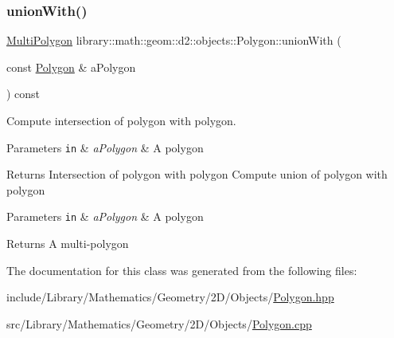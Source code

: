\subsubsection{\texorpdfstring{union\+With()}{unionWith()}}
{\footnotesize\ttfamily \hyperlink{classlibrary_1_1math_1_1geom_1_1d2_1_1objects_1_1_multi_polygon}{Multi\+Polygon} library\+::math\+::geom\+::d2\+::objects\+::\+Polygon\+::union\+With (\begin{DoxyParamCaption}\item[{const \hyperlink{classlibrary_1_1math_1_1geom_1_1d2_1_1objects_1_1_polygon}{Polygon} \&}]{a\+Polygon }\end{DoxyParamCaption}) const}



Compute intersection of polygon with polygon. 


\begin{DoxyParams}[1]{Parameters}
\mbox{\tt in}  & {\em a\+Polygon} & A polygon \\
\hline
\end{DoxyParams}
\begin{DoxyReturn}{Returns}
Intersection of polygon with polygon Compute union of polygon with polygon
\end{DoxyReturn}

\begin{DoxyParams}[1]{Parameters}
\mbox{\tt in}  & {\em a\+Polygon} & A polygon \\
\hline
\end{DoxyParams}
\begin{DoxyReturn}{Returns}
A multi-\/polygon 
\end{DoxyReturn}


The documentation for this class was generated from the following files\+:\begin{DoxyCompactItemize}
\item 
include/\+Library/\+Mathematics/\+Geometry/2\+D/\+Objects/\hyperlink{2_d_2_objects_2_polygon_8hpp}{Polygon.\+hpp}\item 
src/\+Library/\+Mathematics/\+Geometry/2\+D/\+Objects/\hyperlink{2_d_2_objects_2_polygon_8cpp}{Polygon.\+cpp}\end{DoxyCompactItemize}
